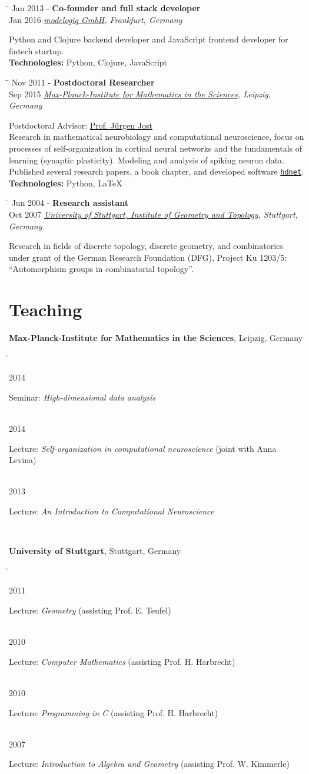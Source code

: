 \documentclass[10pt]{article} %
\newlength{\smallertextwidth}
\newcommand{\job}[5]{
\begin{tabbing}
\hspace{2.2cm} \= \kill
{#1} \> \textbf{#3}\\
{#2} \>\+ \textit{#4}\\[3pt]
\begin{minipage}{\smallertextwidth}
\vspace{2mm}
#5
\end{minipage}
\end{tabbing}
\vspace{2mm}
}
\newcommand{\tabbedblock}[1]{
\begin{tabbing}%
\hspace{2.2cm}\=\hspace{15cm}\=\kill%
#1%
\end{tabbing}
}
\newcommand{\tabitem}[2]{%
#1\>\begin{minipage}[t]{15cm}#2\end{minipage}\\[5pt]
}
\begin{document}
\job
{Jan 2013 -}{Jan 2016}
{Co-founder and full stack developer}
{\href{https://modelogiq.com}{modelogiq GmbH}\textup{, Frankfurt, Germany}}
{
  Python and Clojure backend developer and JavaScript frontend developer for fintech startup.\\[5pt]
  \textbf{Technologies:} Python, Clojure, JavaScript
}

\job
{Nov 2011 -}{Sep 2015}
{Postdoctoral Researcher}
{\href{https://www.mis.mpg.de}{Max-Planck-Institute for Mathematics in the Sciences}\textup{, Leipzig, Germany}}
{
  Postdoctoral Advisor: \href{https://www.mis.mpg.de/de/jjost/juergen-jost.html}{Prof. Jürgen Jost}\\
  Research in mathematical neurobiology and computational neuroscience, focus on processes of self-organization
  in cortical neural networks and the fundamentals of learning (synaptic plasticity). Modeling and analysis
  of spiking neuron data. Published several research papers, a book chapter, and developed software
  \texttt{\href{https://github.com/team-hdnet/hdnet}{hdnet}}.\\[5pt]
  \textbf{Technologies:} Python, LaTeX
}

\job
{Jun 2004 -}{Oct 2007}
{Research assistant}
{\href{http://www.igt.uni-stuttgart.de}{University of Stuttgart, Institute of Geometry and Topology}\textup{, Stuttgart, Germany}}
{
  Research in fields of discrete topology, discrete geometry, and combinatorics under grant
  of the German Research Foundation (DFG), Project Ku 1203/5: ``Automorphism groups in combinatorial topology''.
}


\section{Teaching}

\textbf{Max-Planck-Institute for Mathematics in the Sciences}, Leipzig, Germany
%
\tabbedblock{
  \tabitem
  {2014}
  {Seminar: \textit{High-dimensional data analysis}}
  \tabitem
  {2014}
  {Lecture: \textit{Self-organization in computational neuroscience} (joint with Anna Levina)}
  \tabitem
  {2013}
  {Lecture: \textit{An Introduction to Computational Neuroscience}}
}

\textbf{University of Stuttgart}, Stuttgart, Germany
%
\tabbedblock{
  \tabitem
  {2011}
  {Lecture: \textit{Geometry} (assisting Prof. E. Teufel)}
  \tabitem
  {2010}
  {Lecture: \textit{Computer Mathematics} (assisting Prof. H. Harbrecht)}
  \tabitem
  {2010}
  {Lecture: \textit{Programming in C} (assisting Prof. H. Harbrecht)}
  \tabitem
  {2007}
  {Lecture: \textit{Introduction to Algebra and Geometry} (assisting Prof. W. Kimmerle)}
}
\end{document}
